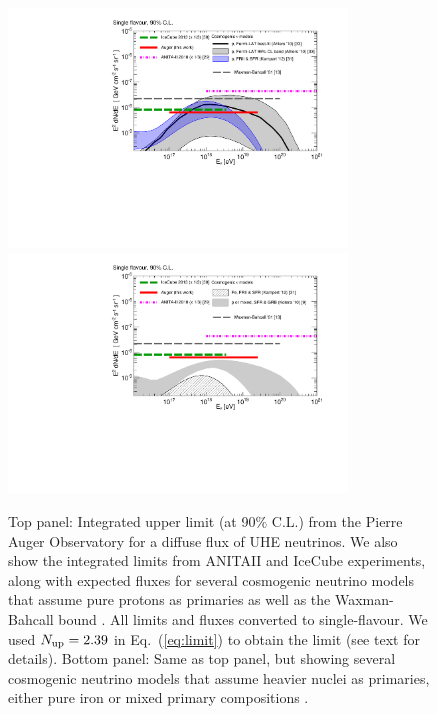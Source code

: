 \documentclass[reprint,showpacs,showkeys,amsmath,amssymb,aps,nofootinbib]{revtex4-1}
\begin{document}
\begin{figure}[!t]
\centering
\includegraphics[width=9.0cm]{./integral_limits_and_models_paper_combined_proton.pdf}
\includegraphics[width=9.0cm]{./integral_limits_and_models_paper_combined_heavy.pdf}
\vskip -3mm
\caption{ 
Top panel: Integrated upper limit (at 90$\%$ C.L.)
from the Pierre Auger Observatory 
for a diffuse flux of UHE neutrinos. 
We also show the integrated limits from ANITAII \cite{ANITAII} and IceCube \cite{IceCube_latest_limit} experiments,
along with expected fluxes for several cosmogenic neutrino models that assume pure protons as primaries \cite{Ahlers_GZK,Kampert_GZK}
as well as the Waxman-Bahcall bound \cite{WB}.
All limits and fluxes converted to single-flavour.
We used $N_{\rm up}=2.39$ in Eq.~(\ref{eq:limit}) 
to obtain the limit (see text for details).
Bottom panel: Same as top panel, but showing several cosmogenic 
neutrino models that assume heavier nuclei as primaries, 
either pure iron \cite{Kampert_GZK} or mixed primary compositions \cite{Kotera_GZK}.
}
\label{fig:limits}
\end{figure}
\end{document}
